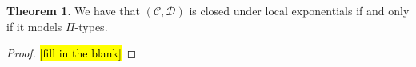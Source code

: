 \documentclass{article}
\theoremstyle{definition}
\newtheorem{theorem}[definition]{Theorem}
\newcommand{\type}{\ \textsc{type}}
\newcommand{\C}{\mathcal C}
\newcommand{\D}{\mathcal D}
\newcommand{\Id}{\mathtt {Id}}
\begin{document}
\begin{theorem}
    We have that $(\C, \D)$ is closed under local exponentials if and only if it models $\Pi$-types.
\end{theorem}

\begin{proof}
    \hl{[fill in the blank]}
\end{proof}






\end{document}
